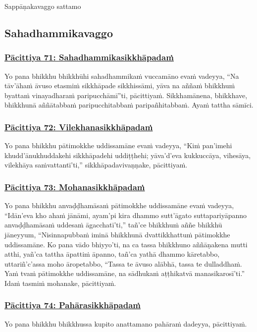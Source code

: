 \begin{center}
  Sappāṇakavaggo sattamo
\end{center}

\subsection{Sahadhammikavaggo}
\vspace{0.2cm}

\subsubsection*{\hyperref[exp71]{Pācittiya 71: Sahadhammikasikkhāpadaṁ}}
\label{pac71}
Yo pana bhikkhu bhikkhūhi sahadhammikaṁ vuccamāno evaṁ vadeyya, ``Na tāv'āhaṁ āvuso etasmiṁ sikkhāpade sikkhissāmi, yāva na aññaṁ bhikkhuṁ byattaṁ vinayadharaṁ paripucchāmī''ti, pācittiyaṁ. Sikkhamānena, bhikkhave, bhikkhunā aññātabbaṁ paripucchitabbaṁ paripañhitabbaṁ. Ayaṁ tattha sāmīci.

\subsubsection*{\hyperref[exp72]{Pācittiya 72: Vilekhanasikkhāpadaṁ}}
\label{pac72}
Yo pana bhikkhu pātimokkhe uddissamāne evaṁ vadeyya, ``Kiṁ pan'imehi khudd'ānukhuddakehi sikkhāpadehi uddiṭṭhehi; yāva'd'eva kukkuccāya, vihesāya, vilekhāya saṁvattantī'ti,'' sikkhāpadavivaṇṇake, pācittiyaṁ.

\subsubsection*{\hyperref[exp73]{Pācittiya 73: Mohanasikkhāpadaṁ}}
\label{pac73}
Yo pana bhikkhu anvaḍḍhamāsaṁ pātimokkhe uddissamāne evaṁ vadeyya, ``Idān'eva kho ahaṁ jānāmi, ayam'pi kira dhammo sutt'āgato suttapariyāpanno anvaḍḍhamāsaṁ uddesaṁ āgacchatī'ti,'' tañ'ce bhikkhuṁ aññe bhikkhū jāneyyum, ``Nisinnapubbaṁ iminā bhikkhunā dvattikkhattuṁ pātimokkhe uddissamāne. Ko pana vādo bhiyyo'ti, na ca tassa bhikkhuno aññāṇakena mutti atthi, yañ'ca tattha āpattiṁ āpanno, tañ'ca yathā dhammo kāretabbo, uttariñ'c'assa moho āropetabbo, ``Tassa te āvuso alābhā, tassa te dulladdhaṁ. Yaṁ tvaṁ pātimokkhe uddissamāne, na sādhukaṁ aṭṭhikatvā manasikarosī'ti.'' Idaṁ tasmiṁ mohanake, pācittiyaṁ.

\subsubsection*{\hyperref[exp74]{Pācittiya 74: Pahārasikkhāpadaṁ}}
\label{pac74}
Yo pana bhikkhu bhikkhussa kupito anattamano pahāraṁ dadeyya, pācittiyaṁ.

